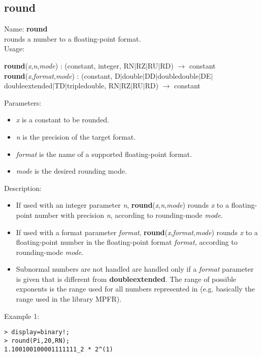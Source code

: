 \subsection{round}
\label{labround}
\noindent Name: \textbf{round}\\
rounds a number to a floating-point format.\\
\noindent Usage: 
\begin{center}
\textbf{round}(\emph{x},\emph{n},\emph{mode}) : (\textsf{constant}, \textsf{integer}, \textsf{RN$|$RZ$|$RU$|$RD}) $\rightarrow$ \textsf{constant}\\
\textbf{round}(\emph{x},\emph{format},\emph{mode}) : (\textsf{constant}, \textsf{D$|$double$|$DD$|$doubledouble$|$DE$|$doubleextended$|$TD$|$tripledouble}, \textsf{RN$|$RZ$|$RU$|$RD}) $\rightarrow$ \textsf{constant}\\
\end{center}
Parameters: 
\begin{itemize}
\item \emph{x} is a constant to be rounded.
\item \emph{n} is the precision of the target format.
\item \emph{format} is the name of a supported floating-point format.
\item \emph{mode} is the desired rounding mode.
\end{itemize}
\noindent Description: \begin{itemize}

\item If used with an integer parameter \emph{n}, \textbf{round}(\emph{x},\emph{n},\emph{mode}) rounds \emph{x} to a floating-point number with 
   precision \emph{n}, according to rounding-mode \emph{mode}. 

\item If used with a format parameter \emph{format}, \textbf{round}(\emph{x},\emph{format},\emph{mode}) rounds \emph{x} to a floating-point number in the 
   floating-point format \emph{format}, according to rounding-mode \emph{mode}. 

\item Subnormal numbers are not handled are handled only if a \emph{format} parameter is given
   that is different from \textbf{doubleextended}. The range of possible exponents is the 
   range used for all numbers represented in \sollya (e.g. basically the range 
   used in the library MPFR). 
\end{itemize}
\noindent Example 1: 
\begin{center}\begin{minipage}{15cm}\begin{Verbatim}[frame=single]
> display=binary!;
> round(Pi,20,RN);
1.100100100001111111_2 * 2^(1)
\end{Verbatim}
\end{minipage}\end{center}
